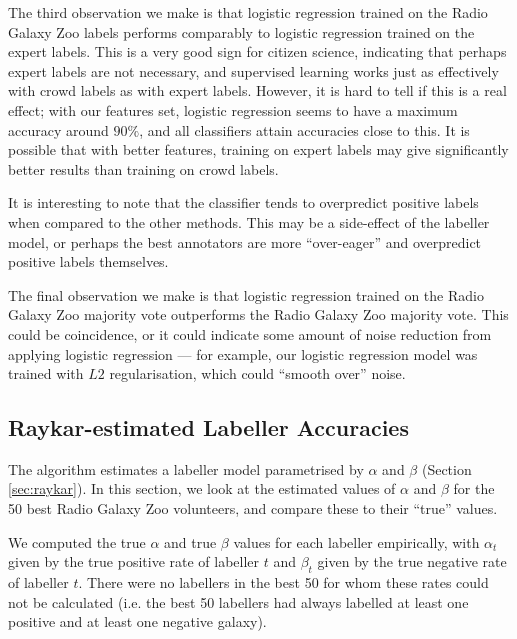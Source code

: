     The third observation we make is that logistic regression trained on the
    Radio Galaxy Zoo labels performs comparably to logistic regression trained
    on the expert labels. This is a very good sign for citizen science,
    indicating that perhaps expert labels are not necessary, and supervised
    learning works just as effectively with crowd labels as with expert labels.
    However, it is hard to tell if this is a real effect; with our features set,
    logistic regression seems to have a maximum accuracy around $90\%$, and all
    classifiers attain accuracies close to this. It is possible that with better
    features, training on expert labels may give significantly better results
    than training on crowd labels.

    It is interesting to note that the \citeauthor{raykar10} classifier tends to
    overpredict positive labels when compared to the other methods. This may be
    a side-effect of the labeller model, or perhaps the best annotators are more
    ``over-eager'' and overpredict positive labels themselves.

    The final observation we make is that logistic regression trained on the
    Radio Galaxy Zoo majority vote outperforms the Radio Galaxy Zoo majority
    vote. This could be coincidence, or it could indicate some amount of noise
    reduction from applying logistic regression --- for example, our logistic
    regression model was trained with $L2$ regularisation, which could ``smooth
    over'' noise.

  \subsection{Raykar-estimated Labeller Accuracies}
  \label{sec:raykar-estimates-rgz}

    The \citeauthor{raykar10} algorithm estimates a labeller model parametrised
    by $\alpha$ and $\beta$ (Section \ref{sec:raykar}). In this section, we look
    at the estimated values of $\alpha$ and $\beta$ for the 50 best Radio Galaxy
    Zoo volunteers, and compare these to their ``true'' values.

    We computed the true $\alpha$ and true $\beta$ values for each labeller
    empirically, with $\alpha_t$ given by the true positive rate of labeller $t$
    and $\beta_t$ given by the true negative rate of labeller $t$. There were no
    labellers in the best 50 for whom these rates could not be calculated (i.e.
    the best 50 labellers had always labelled at least one positive and at least
    one negative galaxy).

